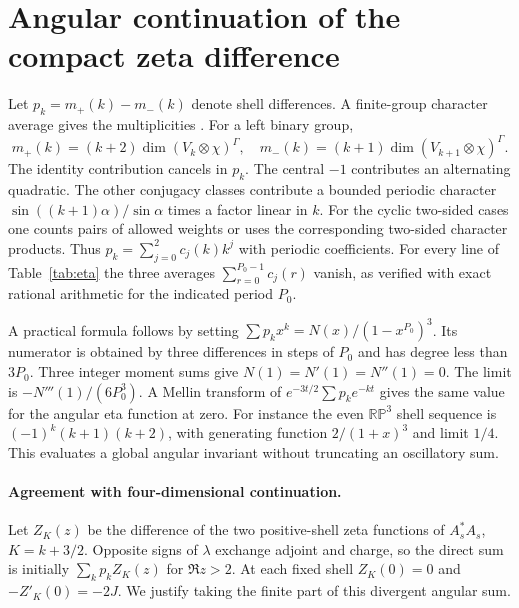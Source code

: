 \section{Angular continuation of the compact zeta difference}\label{app:zeta}
Let $p_k=m_+(k)-m_-(k)$ denote shell differences. A finite-group character average gives the multiplicities \cite{BarSpin}. For a left binary group,
\[
 m_+(k)=(k+2)\dim(V_k\otimes\chi)^\Gamma,\quad
 m_-(k)=(k+1)\dim(V_{k+1}\otimes\chi)^\Gamma .
\]
The identity contribution cancels in $p_k$. The central $-1$ contributes an alternating quadratic. The other conjugacy classes contribute a bounded periodic character $\sin((k+1)\alpha)/\sin\alpha$ times a factor linear in $k$. For the cyclic two-sided cases one counts pairs of allowed weights or uses the corresponding two-sided character products. Thus $p_k=\sum_{j=0}^2 c_j(k)k^j$ with periodic coefficients. For every line of Table~\ref{tab:eta} the three averages $\sum_{r=0}^{P_0-1}c_j(r)$ vanish, as verified with exact rational arithmetic for the indicated period $P_0$.

A practical formula follows by setting $\sum p_k x^k=N(x)/(1-x^{P_0})^3$. Its numerator is obtained by three differences in steps of $P_0$ and has degree less than $3P_0$. Three integer moment sums give $N(1)=N'(1)=N''(1)=0$. The limit is $-N'''(1)/(6P_0^3)$. A Mellin transform of $e^{-3t/2}\sum p_k e^{-kt}$ gives the same value for the angular eta function at zero. For instance the even $\mathbb{RP}^3$ shell sequence is $(-1)^k(k+1)(k+2)$, with generating function $2/(1+x)^3$ and limit $1/4$. This evaluates a global angular invariant without truncating an oscillatory sum.

\paragraph{Agreement with four-dimensional continuation.}
Let $Z_K(z)$ be the difference of the two positive-shell zeta functions of $A_s^*A_s$, $K=k+3/2$. Opposite signs of $\lambda$ exchange adjoint and charge, so the direct sum is initially $\sum_k p_k Z_K(z)$ for $\Re z>2$. At each fixed shell $Z_K(0)=0$ and $-Z'_K(0)=-2J$. We justify taking the finite part of this divergent angular sum.

